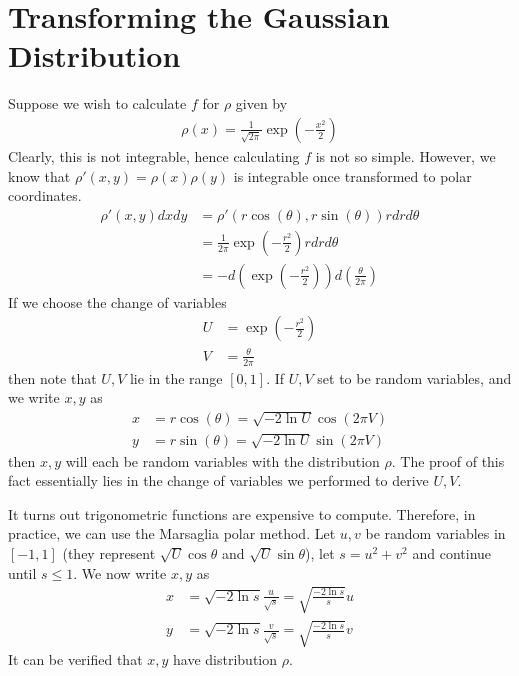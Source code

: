 \documentclass{article}
\begin{document}
\section{Transforming the Gaussian Distribution}

Suppose we wish to calculate $f$ for $\rho$ given by
\begin{align*}
    \rho(x) = \frac{1}{\sqrt{2\pi}} \exp\left(-\frac{x^2}{2}\right)
\end{align*}
Clearly, this is not integrable, hence calculating $f$ is not so simple.
However, we know that $\rho'(x, y) = \rho(x)\rho(y)$ is integrable once transformed to polar coordinates.
\begin{align*}
    \rho'(x, y) dx dy &= \rho'(r \cos(\theta), r \sin(\theta)) r dr d\theta \\
    &= \frac{1}{2 \pi} \exp\left(-\frac{r^2}{2}\right) r dr d\theta \\
    &= - d \left(\exp\left(-\frac{r^2}{2}\right) \right) d\left(\frac{\theta}{2\pi}\right)
\end{align*}
If we choose the change of variables
\begin{align*}
    U &= \exp\left(-\frac{r^2}{2}\right) \\
    V &= \frac{\theta}{2\pi}
\end{align*}
then note that $U, V$ lie in the range $[0, 1]$. If $U, V$ set to be random variables,
and we write $x, y$ as
\begin{align*}
    x &= r \cos(\theta) = \sqrt{-2 \ln U} \cos(2 \pi V) \\
    y &= r \sin(\theta) = \sqrt{-2 \ln U} \sin(2 \pi V)
\end{align*}
then $x, y$ will each be random variables with the distribution $\rho$.
The proof of this fact essentially lies in the change of variables we performed to derive $U, V$.

It turns out trigonometric functions are expensive to compute. Therefore, in practice, we can use the Marsaglia polar method.
Let $u, v$ be random variables in $[-1, 1]$ (they represent $\sqrt{U} \cos{\theta}$ and $\sqrt{U} \sin {\theta}$), let $s = u^2 + v^2$ and continue until $s \leq 1$.
We now write $x, y$ as
\begin{align*}
    x &= \sqrt{-2\ln s} \frac{u}{\sqrt{s}} = \sqrt{\frac{-2\ln s}{s}} u \\
    y &= \sqrt{-2\ln s} \frac{v}{\sqrt{s}} = \sqrt{\frac{-2\ln s}{s}} v
\end{align*}
It can be verified that $x, y$ have distribution $\rho$.
\end{document}
